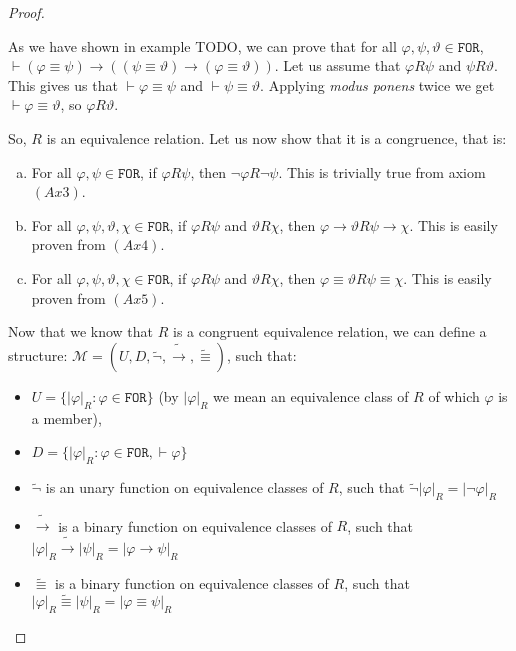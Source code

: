 \documentclass{article}
\theoremstyle{definition}
\newcommand*{\id}{\equiv}
\newcommand*{\ra}{\rightarrow}
\newcommand*{\FOR}{\texttt{FOR}}
\begin{document}
\begin{proof}
\begin{enumerate}[(a)]
              As we have shown in example TODO, we can prove that for all $\varphi, \psi,
                  \vartheta \in \FOR$, $\vdash (\varphi \id \psi) \ra ((\psi \id \vartheta) \ra
                  (\varphi \id \vartheta))$. Let us assume that $\varphi R \psi$ and $\psi R
                  \vartheta$. This gives us that $\vdash \varphi \id \psi$ and $\vdash \psi \id
                  \vartheta$. Applying \emph{modus ponens} twice we get $\vdash \varphi \id
                  \vartheta$, so $\varphi R \vartheta$.
    \end{enumerate}

    So, $R$ is an equivalence relation. Let us now show that it is a congruence,
    that is:
    \begin{enumerate}[(a)]
        \item For all $\varphi, \psi \in \FOR$, if $\varphi R \psi$, then $\lnot \varphi R
                  \lnot \psi$. This is trivially true from axiom $(Ax3)$.
        \item For all $\varphi, \psi, \vartheta, \chi \in \FOR$, if $\varphi R \psi$ and
              $\vartheta R \chi$, then $\varphi \ra \vartheta R \psi \ra \chi$. This is
              easily proven from $(Ax4)$.
        \item For all $\varphi, \psi, \vartheta, \chi \in \FOR$, if $\varphi R \psi$ and
              $\vartheta R \chi$, then $\varphi \id \vartheta R \psi \id \chi$. This is
              easily proven from $(Ax5)$.
    \end{enumerate}

    Now that we know that $R$ is a congruent equivalence relation, we can define a
    structure: $\mathcal{M} = (U, D, \tilde{\lnot}, \tilde{\ra}, \tilde{\id})$,
    such that:
    \begin{itemize}
        \item $U = \{ |\varphi|_R : \varphi \in \FOR \}$ (by $|\varphi|_R$ we mean an equivalence class of $R$ of which $\varphi$ is a member),
        \item $D = \{ |\varphi|_R : \varphi \in \FOR, \vdash \varphi\}$
        \item $\tilde{\lnot}$ is an unary function on equivalence classes of $R$, such that $\tilde{\lnot}|\varphi|_R = |\lnot \varphi|_R$
        \item $\tilde{\ra}$ is a binary function on equivalence classes of $R$, such that $|\varphi|_R \tilde{\ra} |\psi|_R = |\varphi \ra \psi|_R$
        \item $\tilde{\id}$ is a binary function on equivalence classes of $R$, such that $|\varphi|_R \tilde{\id} |\psi|_R = |\varphi \id \psi|_R$
    \end{itemize}


\end{proof}
\end{document}
